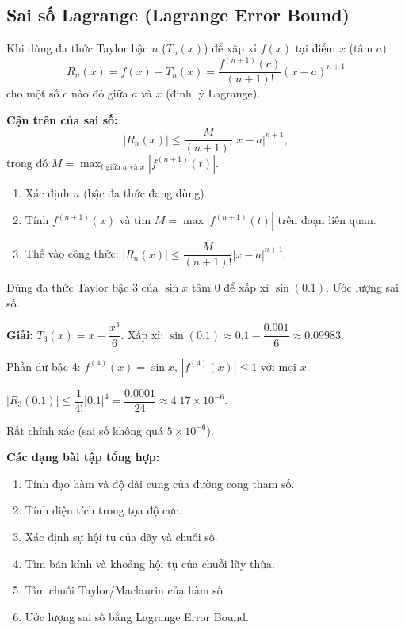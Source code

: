 \documentclass[12pt,a4paper]{article}
\begin{document}
\subsection{Sai số Lagrange (Lagrange Error Bound)}

\begin{dinhly}[title={Phần dư Taylor và cận sai số Lagrange}]
  Khi dùng đa thức Taylor bậc $n$ ($T_n(x)$) để xấp xỉ $f(x)$ tại điểm $x$ (tâm $a$):
  \[
    R_n(x) = f(x) - T_n(x) = \frac{f^{(n+1)}(c)}{(n+1)!}(x-a)^{n+1}
  \]
  cho một số $c$ nào đó giữa $a$ và $x$ (định lý Lagrange).

  \textbf{Cận trên của sai số:}
  \[
    |R_n(x)| \le \frac{M}{(n+1)!}|x-a|^{n+1},
  \]
  trong đó $M = \max_{t \text{ giữa } a \text{ và } x} |f^{(n+1)}(t)|$.
\end{dinhly}

\begin{phuongphap}[title={Sử dụng Lagrange Error Bound}]
  \begin{enumerate}
    \item Xác định $n$ (bậc đa thức đang dùng).
    \item Tính $f^{(n+1)}(x)$ và tìm $M = \max |f^{(n+1)}(t)|$ trên đoạn liên quan.
    \item Thế vào công thức: $|R_n(x)| \le \dfrac{M}{(n+1)!}|x-a|^{n+1}$.
  \end{enumerate}
\end{phuongphap}

\begin{vidu}
  Dùng đa thức Taylor bậc 3 của $\sin x$ tâm $0$ để xấp xỉ $\sin(0.1)$. Ước lượng sai số.

  \medskip\textbf{Giải:}
  $T_3(x) = x - \dfrac{x^3}{6}$. Xấp xỉ: $\sin(0.1) \approx 0.1 - \dfrac{0.001}{6} \approx 0.09983$.

  Phần dư bậc 4: $f^{(4)}(x) = \sin x$, $|f^{(4)}(x)| \le 1$ với mọi $x$.

  $|R_3(0.1)| \le \dfrac{1}{4!}|0.1|^4 = \dfrac{0.0001}{24} \approx 4.17 \times 10^{-6}$.

  Rất chính xác (sai số không quá $5 \times 10^{-6}$).
\end{vidu}

\medskip\noindent\textbf{Các dạng bài tập tổng hợp:}
\begin{enumerate}[label=\textbf{Dạng \arabic*:}, leftmargin=*, align=left]
  \item Tính đạo hàm và độ dài cung của đường cong tham số.
  \item Tính diện tích trong tọa độ cực.
  \item Xác định sự hội tụ của dãy và chuỗi số.
  \item Tìm bán kính và khoảng hội tụ của chuỗi lũy thừa.
  \item Tìm chuỗi Taylor/Maclaurin của hàm số.
  \item Ước lượng sai số bằng Lagrange Error Bound.
\end{enumerate}
\end{document}
